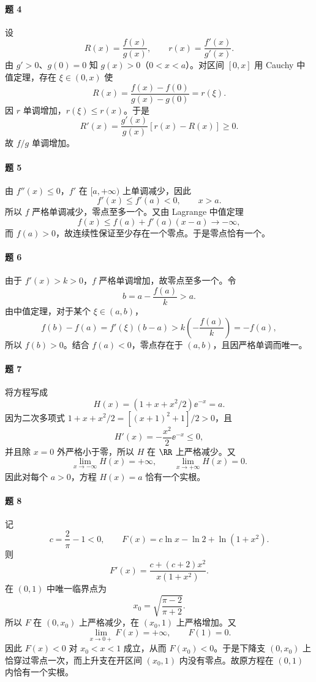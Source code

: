 \paragraph{题 4}
\begin{xsolution}
设
\[
  R(x)=\frac{f(x)}{g(x)},\qquad r(x)=\frac{f'(x)}{g'(x)}.
\]
由 $g'>0$、$g(0)=0$ 知 $g(x)>0$（$0<x<a$）。对区间 $[0,x]$ 用 Cauchy 中值定理，存在 $\xi\in(0,x)$ 使
\[
  R(x)=\frac{f(x)-f(0)}{g(x)-g(0)}=r(\xi).
\]
因 $r$ 单调增加，$r(\xi)\le r(x)$。于是
\[
  R'(x)=\frac{g'(x)}{g(x)}[r(x)-R(x)]\ge0.
\]
故 $f/g$ 单调增加。
\end{xsolution}

\paragraph{题 5}
\begin{xsolution}
由 $f''(x)\le0$，$f'$ 在 $[a,+\infty)$ 上单调减少，因此
\[
  f'(x)\le f'(a)<0,\qquad x>a.
\]
所以 $f$ 严格单调减少，零点至多一个。又由 Lagrange 中值定理
\[
  f(x)\le f(a)+f'(a)(x-a)\to-\infty,
\]
而 $f(a)>0$，故连续性保证至少存在一个零点。于是零点恰有一个。
\end{xsolution}

\paragraph{题 6}
\begin{xsolution}
由于 $f'(x)>k>0$，$f$ 严格单调增加，故零点至多一个。令
\[
  b=a-\frac{f(a)}k>a.
\]
由中值定理，对于某个 $\xi\in(a,b)$，
\[
  f(b)-f(a)=f'(\xi)(b-a)>k\left(-\frac{f(a)}k\right)=-f(a),
\]
所以 $f(b)>0$。结合 $f(a)<0$，零点存在于 $(a,b)$，且因严格单调而唯一。
\end{xsolution}

\paragraph{题 7}
\begin{xsolution}
将方程写成
\[
  H(x)=(1+x+x^2/2)\ee^{-x}=a.
\]
因为二次多项式 $1+x+x^2/2=[(x+1)^2+1]/2>0$，且
\[
  H'(x)=-\frac{x^2}{2}\ee^{-x}\le0,
\]
并且除 $x=0$ 外严格小于零，所以 $H$ 在 $\RR$ 上严格减少。又
\[
  \lim_{x\to-\infty}H(x)=+\infty,
  \qquad
  \lim_{x\to+\infty}H(x)=0.
\]
因此对每个 $a>0$，方程 $H(x)=a$ 恰有一个实根。
\end{xsolution}

\paragraph{题 8}
\begin{xsolution}
记
\[
  c=\frac2\pi-1<0,
  \qquad
  F(x)=c\ln x-\ln2+\ln(1+x^2).
\]
则
\[
  F'(x)=\frac{c+(c+2)x^2}{x(1+x^2)}.
\]
在 $(0,1)$ 中唯一临界点为
\[
  x_0=\sqrt{\frac{\pi-2}{\pi+2}}.
\]
所以 $F$ 在 $(0,x_0)$ 上严格减少，在 $(x_0,1)$ 上严格增加。又
\[
  \lim_{x\to0+}F(x)=+\infty,
  \qquad F(1)=0.
\]
因此 $F(x)<0$ 对 $x_0<x<1$ 成立，从而 $F(x_0)<0$。于是下降支 $(0,x_0)$ 上恰穿过零点一次，而上升支在开区间 $(x_0,1)$ 内没有零点。故原方程在 $(0,1)$ 内恰有一个实根。
\end{xsolution}

